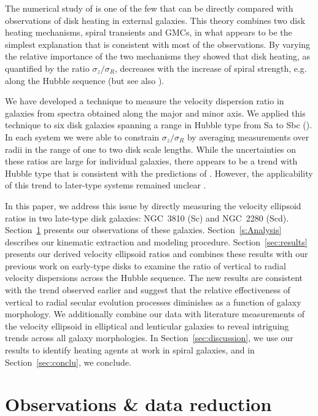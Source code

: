 \documentclass[useAMS,usenatbib]{mn2e}
\begin{document}
The numerical study of \citet{Jenkins1990} is one of the few that can be
directly compared with observations of disk heating in external
galaxies.  This theory combines two disk heating mechanisms, spiral
transients and GMCs, in what appears to be the simplest explanation that
is consistent with most of the observations.
By varying the relative importance of the two mechanisms they showed
that disk heating, as quantified by the ratio $\sigma_z / \sigma_R$,
decreases with the increase of spiral strength, e.g. along the Hubble
sequence (but see also \citealt{sellwood2008}).

We have developed a technique \citep{Gerssen1997} to measure the
velocity dispersion ratio in galaxies from spectra obtained along the
major and minor axis.  We applied this technique to six disk galaxies
spanning a range in Hubble type from Sa to Sbc (\citealt{Gerssen1997,
  Gerssen2000, Shapiro2003}).  In each system we were able to constrain
$\sigma_z / \sigma_R$ by averaging measurements over radii in the range
of one to two disk scale lengths.  While the uncertainties on these
ratios are large for individual galaxies, there appears to be a trend
with Hubble type that is consistent with the predictions of
\citet{Jenkins1990}.  However, the applicability of this trend to
later-type systems remained unclear \citep{Shapiro2003}.

In this paper, we address this issue by directly measuring the velocity
ellipsoid ratios in two late-type disk galaxies: NGC~3810 (Sc) and
NGC~2280 (Scd).  Section~\ref{s:Obs} presents our observations of these
galaxies.  Section~\ref{s:Analysis} describes our kinematic extraction
and modeling procedure.  Section~\ref{sec:results} presents our derived
velocity ellipsoid ratios and combines these results with our previous
work on early-type disks to examine the ratio of vertical to radial
velocity dispersions across the Hubble sequence.  The new results are
consistent with the trend observed earlier and suggest that the relative
effectiveness of vertical to radial secular evolution processes
diminishes as a function of galaxy morphology.  We additionally combine
our data with literature measurements of the velocity ellipsoid in
elliptical and lenticular galaxies \citep{sauronX} to reveal intriguing
trends across all galaxy morphologies.  In Section~\ref{sec:discussion},
we use our results to identify heating agents at work in spiral
galaxies, and in Section~\ref{sec:conclu}, we conclude.



\section{Observations \& data reduction}
\label{s:Obs}
\end{document}
